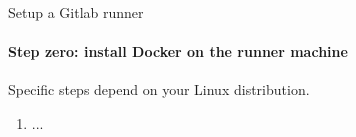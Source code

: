 \begin{frame}{Setup a Gitlab runner}
    \framesubtitle{Step zero: install Docker on the runner machine}
    Specific steps depend on your Linux distribution. 
    \begin{enumerate}
        \item ...
    \end{enumerate}
\end{frame}
